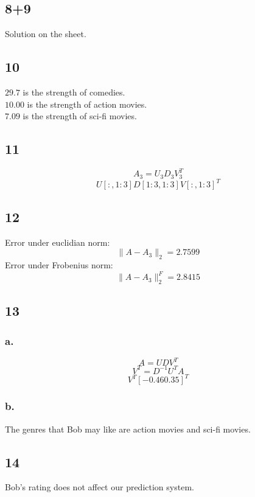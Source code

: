 \documentclass{article}
\begin{document}
\subsection{8+9}
Solution on the sheet.

\subsection{10}
$29.7$ is the strength of comedies.\\
$10.00$ is the strength of action movies.\\
$7.09$ is the strength of sci-fi movies.

\subsection{11}
$$A_3 = U_3D_3V^T_3$$
$$U[:,1:3]D[1:3, 1:3]V[:,1:3]^T$$

\subsection{12}
Error under euclidian norm: 
$$\|A - A_3\|_2 = 2.7599$$
Error under Frobenius norm:
$$\|A - A_3\|_2^F = 2.8415$$

\subsection{13}
\subsubsection{a.}
$$A = UDV^T$$
$$V^T = D^{-1}U^TA$$
$$V^T[-0.46 0.35]^T$$
\subsubsection{b.}
The genres that Bob may like are action movies and sci-fi movies.
\subsection{14}
Bob's rating does not affect our prediction system.
\end{document}
